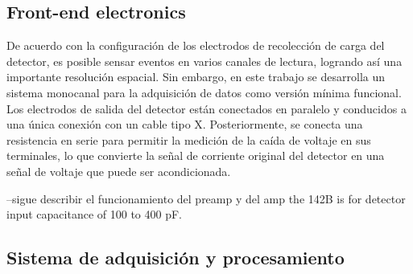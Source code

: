 \documentclass[]{book}
\begin{document}
\subsection*{Front-end electronics}

\noindent De acuerdo con la configuración de los electrodos de recolección de carga del detector, es posible sensar eventos en varios canales de lectura, logrando así una importante resolución espacial. Sin embargo, en este trabajo se desarrolla un sistema monocanal para la adquisición de datos como versión mínima funcional. Los electrodos de salida del detector están conectados en paralelo y conducidos a una única conexión con un cable tipo X. Posteriormente, se conecta una resistencia en serie para permitir la medición de la caída de voltaje en sus terminales, lo que convierte la señal de corriente original del detector en una señal de voltaje que puede ser acondicionada.

--sigue describir el funcionamiento del preamp y del amp
the 142B is for detector input capacitance of 100 to 400 pF.


\subsection*{Sistema de adquisición y procesamiento}

\noindent 
\end{document}
